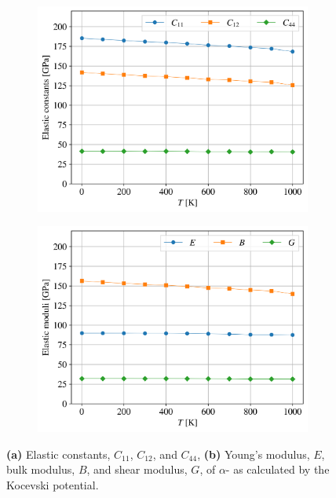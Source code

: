 \documentclass[preprint, 12pt]{elsarticle}
\begin{document}
\begin{figure}[h!]
\centering
\begin{subfigure}{0.45\textwidth}
    \includegraphics[width=\textwidth]{ElasticConstantsaU2N3.png}
    \caption{}
    \label{Fig:ElasConstaU2N3}
\end{subfigure}
\hfill
\begin{subfigure}{0.45\textwidth}
    \includegraphics[width=\textwidth]{ElasticModuliaU2N3.png}
    \caption{}
    \label{Fig:ElasModaU2N3}
\end{subfigure}
\hfill
\caption{\textbf{(a)} Elastic constants, $C_{11}$, $C_{12}$, and $C_{44}$, \textbf{(b)} Young's modulus, $E$, bulk modulus, $B$, and shear modulus, $G$, of $\alpha$- as calculated by the Kocevski potential.}
\label{Fig:ECaU2N3}
\end{figure}
\end{document}
